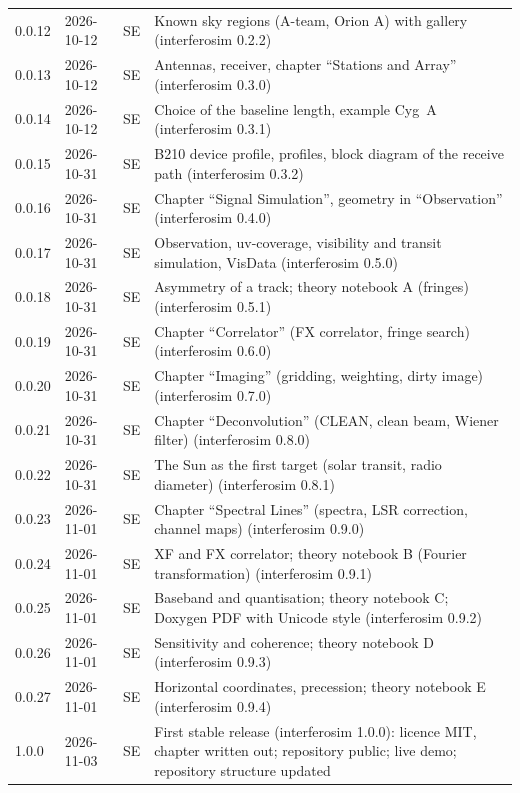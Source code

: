 {\begin{longtable}{ll l >{\raggedright\arraybackslash}p{8.4cm}}
    0.0.12 & 2026-10-12 & SE & Known sky regions (A-team, Orion A) with gallery (interferosim 0.2.2) \\
    0.0.13 & 2026-10-12 & SE & Antennas, receiver, chapter \enquote{Stations and Array} (interferosim 0.3.0) \\
    0.0.14 & 2026-10-12 & SE & Choice of the baseline length, example Cyg~A (interferosim 0.3.1) \\
    0.0.15 & 2026-10-31 & SE & B210 device profile, profiles, block diagram of the receive path (interferosim 0.3.2) \\
    0.0.16 & 2026-10-31 & SE & Chapter \enquote{Signal Simulation}, geometry in \enquote{Observation} (interferosim 0.4.0) \\
    0.0.17 & 2026-10-31 & SE & Observation, uv-coverage, visibility and transit simulation, VisData (interferosim 0.5.0) \\
    0.0.18 & 2026-10-31 & SE & Asymmetry of a track; theory notebook A (fringes) (interferosim 0.5.1) \\
    0.0.19 & 2026-10-31 & SE & Chapter \enquote{Correlator} (FX correlator, fringe search) (interferosim 0.6.0) \\
    0.0.20 & 2026-10-31 & SE & Chapter \enquote{Imaging} (gridding, weighting, dirty image) (interferosim 0.7.0) \\
    0.0.21 & 2026-10-31 & SE & Chapter \enquote{Deconvolution} (CLEAN, clean beam, Wiener filter) (interferosim 0.8.0) \\
    0.0.22 & 2026-10-31 & SE & The Sun as the first target (solar transit, radio diameter) (interferosim 0.8.1) \\
    0.0.23 & 2026-11-01 & SE & Chapter \enquote{Spectral Lines} (spectra, LSR correction, channel maps) (interferosim 0.9.0) \\
    0.0.24 & 2026-11-01 & SE & XF and FX correlator; theory notebook B (Fourier transformation) (interferosim 0.9.1) \\
    0.0.25 & 2026-11-01 & SE & Baseband and quantisation; theory notebook C; Doxygen PDF with Unicode style (interferosim 0.9.2) \\
    0.0.26 & 2026-11-01 & SE & Sensitivity and coherence; theory notebook D (interferosim 0.9.3) \\
    0.0.27 & 2026-11-01 & SE & Horizontal coordinates, precession; theory notebook E (interferosim 0.9.4) \\
    1.0.0 & 2026-11-03 & SE & First stable release (interferosim 1.0.0): licence MIT, chapter written out; repository public; live demo; repository structure updated \\
\end{longtable}
}
